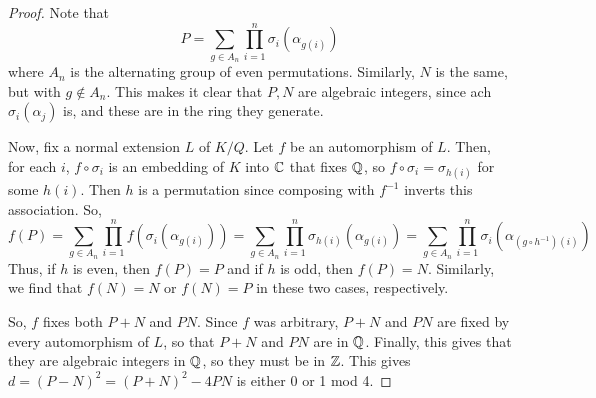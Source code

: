 \begin{proof} 
    Note that
    \[ P = \sum_{g \in A_n} \prod_{i=1}^n \sigma_i(\alpha_{g(i)}) \]
    where $A_n$ is the alternating group of even permutations. Similarly, $N$ is the same, but with $g \notin A_n$. This makes it clear that $P,N$ are algebraic integers, since ach $\sigma_i(\alpha_j)$ is, and these are in the ring they generate.

    Now, fix a normal extension $L$ of $K/Q$. Let $f$ be an automorphism of $L$. Then, for each $i$, $f \circ \sigma_i$ is an embedding of $K$ into $\mathbb{C}$ that fixes $\mathbb{Q}$, so $f \circ \sigma_i = \sigma_{h(i)}$ for some $h(i)$. Then $h$ is a permutation since composing with $f^{-1}$ inverts this association. So,
    \[ f(P) = \sum_{g \in A_n} \prod_{i=1}^n f(\sigma_i(\alpha_{g(i)})) = \sum_{g \in A_n} \prod_{i=1}^n \sigma_{h(i)}(\alpha_{g(i)}) = \sum_{g \in A_n} \prod_{i=1}^n \sigma_i(\alpha_{(g \circ h^{-1})(i)}) \]
    Thus, if $h$ is even, then $f(P) = P$ and if $h$ is odd, then $f(P) = N$. Similarly, we find that $f(N) = N$ or $f(N) = P$ in these two cases, respectively.

    So, $f$ fixes both $P+N$ and $PN$. Since $f$ was arbitrary, $P+N$ and $PN$ are fixed by every automorphism of $L$, so that $P+N$ and $PN$ are in $\mathbb{Q}$. Finally, this gives that they are algebraic integers in $\mathbb{Q}$, so they must be in $\mathbb{Z}$. This gives $d = (P-N)^2 = (P+N)^2 - 4PN$ is either 0 or 1 mod 4.
\end{proof}
